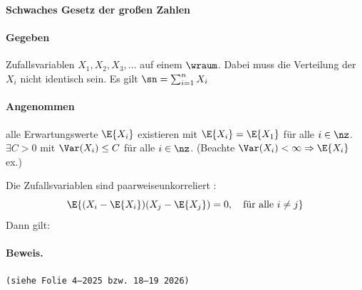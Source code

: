 \begin{satz}
    \textbf{Schwaches Gesetz der großen Zahlen} 

    \paragraph{Gegeben} Zufallsvariablen $X_1, X_2, X_3, \dots$ auf einem $\wraum$.
    Dabei muss die Verteilung der $X_i$ nicht identisch sein.
    Es gilt $\sn = \sum^n_{i=1} X_i$

    \paragraph{Angenommen} alle Erwartungswerte $\E{X_i}$ existieren mit $\E{X_i} = \E{X_1}$
     für alle $i \in \nz$.
    $\exists C > 0$ mit $\Var(X_i) \leq C$ für alle $i \in \nz$.
    (Beachte $\Var(X_i) < \infty \Rightarrow \E{X_i}$ ex.)

    Die Zufallsvariablen sind \gls{paarweiseunkorreliert} :
    \[
        \E{
            (X_i - \E{X_i}) (X_j - \E{X_j}) = 0, \quad \text{für alle } i \neq j
        }
    \]
    Dann gilt: \\


    \paragraph{Beweis.}  \texttt{(siehe Folie 4--2025 bzw. 18--19 2026)}
\end{satz}

